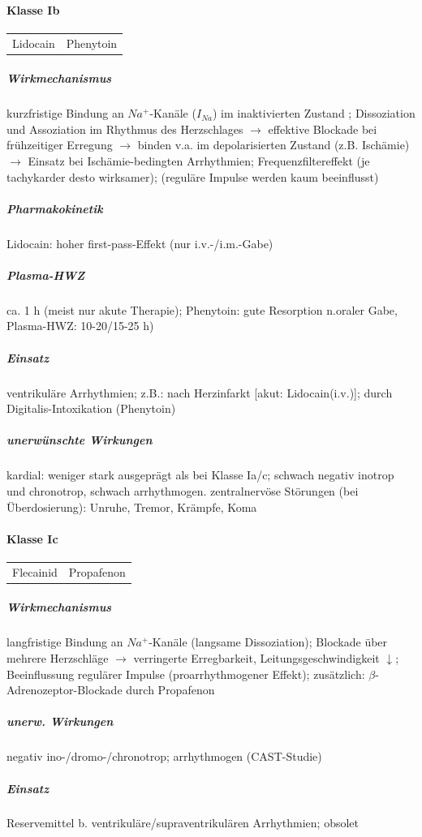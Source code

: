 \documentclass[10pt,a4paper]{report}
\begin{document}
\paragraph{Klasse Ib}
\begin{tabularx}{\textwidth}{XX}
Lidocain&Phenytoin\\	 
\end{tabularx}

\subparagraph{Wirkmechanismus} kurzfristige Bindung an $Na^+$-Kanäle ($I_{Na}$) im inaktivierten Zustand ; Dissoziation und Assoziation im Rhythmus des Herzschlages
	$\rightarrow$ 	effektive Blockade bei frühzeitiger Erregung
	$\rightarrow$ 	binden v.a. im depolarisierten Zustand (z.B. Ischämie) $\rightarrow$ Einsatz bei 	Ischämie-bedingten Arrhythmien; Frequenzfiltereffekt (je tachykarder desto wirksamer); (reguläre Impulse werden kaum beeinflusst)

\subparagraph{Pharmakokinetik} Lidocain: hoher first-pass-Effekt (nur i.v.-/i.m.-Gabe)

\subparagraph{Plasma-HWZ} ca. 1 h (meist nur akute Therapie); Phenytoin: gute Resorption n.oraler Gabe, Plasma-HWZ: 10-20/15-25 h)

\subparagraph{Einsatz}	 ventrikuläre Arrhythmien; z.B.: nach Herzinfarkt [akut: Lidocain(i.v.)]; durch Digitalis-Intoxikation (Phenytoin)	

\subparagraph{unerwünschte Wirkungen} kardial: weniger stark ausgeprägt als bei Klasse Ia/c; schwach negativ inotrop und chronotrop, schwach arrhythmogen. zentralnervöse Störungen (bei Überdosierung): Unruhe, Tremor, Krämpfe, Koma

\paragraph{Klasse Ic}
\begin{tabularx}{\textwidth}{XX}
Flecainid&Propafenon\\ 
\end{tabularx}

\subparagraph{Wirkmechanismus} langfristige Bindung an $Na^+$-Kanäle (langsame Dissoziation); Blockade über mehrere Herzschläge $\rightarrow$ verringerte Erregbarkeit, Leitungsgeschwindigkeit $\downarrow$; Beeinflussung regulärer Impulse (proarrhythmogener Effekt); zusätzlich: $\beta$-Adrenozeptor-Blockade durch Propafenon

\subparagraph{unerw. Wirkungen} negativ ino-/dromo-/chronotrop; arrhythmogen (CAST-Studie)

\subparagraph{Einsatz} Reservemittel b. ventrikuläre/supraventrikulären Arrhythmien; obsolet
\end{document}
